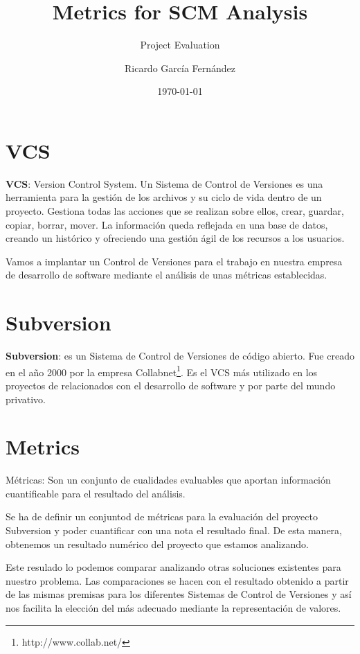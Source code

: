 \documentclass[11pt]{scrartcl}
\title{\textbf{Metrics for SCM Analysis}}
\subtitle{Project Evaluation}
\author{Ricardo Garc\'ia Fern\'andez}
\date{\today}
\begin{document}
\maketitle

\section{VCS}

\par \textbf{VCS}: Version Control System. Un Sistema de Control de Versiones es una herramienta para la gesti\'on de los archivos y su ciclo de vida dentro de un proyecto. Gestiona todas las acciones que se realizan sobre ellos, crear, guardar, copiar, borrar, mover. La informaci\'on queda reflejada en una base de datos, creando un hist\'orico y ofreciendo una gesti\'on \'agil de los recursos a los usuarios.

\par Vamos a implantar un Control de Versiones para el trabajo en nuestra empresa de desarrollo de software mediante el an\'alisis de unas m\'etricas establecidas.

\section{Subversion}

\textbf{Subversion}: es un Sistema de Control de Versiones de c\'odigo abierto.
Fue creado en el a\~no 2000 por la empresa Collabnet\footnote{http://www.collab.net/}.
Es el VCS m\'as utilizado en los proyectos de relacionados con el desarrollo de software y por parte del mundo privativo.

\section{Metrics}

M\'etricas: Son un conjunto de cualidades evaluables que aportan informaci\'on cuantificable para el resultado del an\'alisis.

\par Se ha de definir un conjuntod de m\'etricas para la evaluaci\'on del proyecto Subversion y poder cuantificar con una nota el resultado final. De esta manera, obtenemos un resultado num\'erico del proyecto que estamos analizando.

\par Este resulado lo podemos comparar analizando otras soluciones existentes para nuestro problema.
Las comparaciones se hacen con el resultado obtenido a partir de las mismas premisas para los diferentes Sistemas de Control de Versiones y así nos facilita la elecci\'on del m\'as adecuado mediante la representaci\'on de valores.
\end{document}
